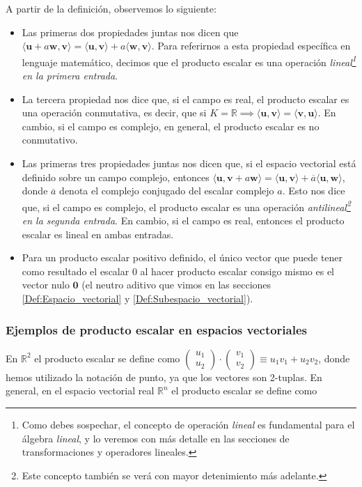 A partir de la definición, observemos lo siguiente:

\begin{itemize}
    \item Las primeras dos propiedades juntas nos dicen que $\langle\mathbf{u}+a\mathbf{w},\mathbf{v}\rangle = \langle\mathbf{u},\mathbf{v}\rangle+a\langle\mathbf{w},\mathbf{v}\rangle$. Para referirnos a esta propiedad específica en lenguaje matemático, decimos que el producto escalar es una operación \textit{lineal\footnote{Como debes sospechar, el concepto de operación \emph{lineal} es fundamental para el álgebra \emph{lineal}, y lo veremos con más detalle en las secciones de transformaciones y operadores lineales.} en la primera entrada}.
    \item La tercera propiedad nos dice que, si el campo es real, el producto escalar es una operación conmutativa, es decir, que si $K=\mathbb{R}\implies\langle\mathbf{u},\mathbf{v}\rangle=\langle\mathbf{v},\mathbf{u}\rangle$. En cambio, si el campo es complejo, en general, el producto escalar es no conmutativo.
    \item Las primeras tres propiedades juntas nos dicen que, si el espacio vectorial está definido sobre un campo complejo, entonces $\langle\mathbf{u},\mathbf{v}+a\mathbf{w}\rangle = \langle\mathbf{u},\mathbf{v}\rangle+\overline{a}\langle\mathbf{u},\mathbf{w}\rangle$, donde $\overline{a}$ denota el complejo conjugado del escalar complejo $a$. Esto nos dice que, si el campo es complejo, el producto escalar es una operación \textit{antilineal\footnote{Este concepto también se verá con mayor detenimiento más adelante.} en la segunda entrada}. En cambio, si el campo es real, entonces el producto escalar es lineal en ambas entradas.
    \item Para un producto escalar positivo definido, el único vector que puede tener como resultado el escalar $0$ al hacer producto escalar consigo mismo es el vector nulo $\mathbf{0}$ (el neutro aditivo que vimos en las secciones \ref{Def:Espacio_vectorial} y \ref{Def:Subespacio_vectorial}).
\end{itemize}


\subsubsection{Ejemplos de producto escalar en espacios vectoriales} \label{Ejem:Producto_escalar}

En $\mathbb{R}^2$ el producto escalar se define como $\begin{pmatrix}u_1\\u_2\end{pmatrix}\cdot\begin{pmatrix}v_1\\v_2\end{pmatrix} \equiv u_1v_1+u_2v_2$, donde hemos utilizado la notación de punto, ya que los vectores son 2-tuplas. En general, en el espacio vectorial real $\mathbb{R}^n$ el producto escalar se define como

